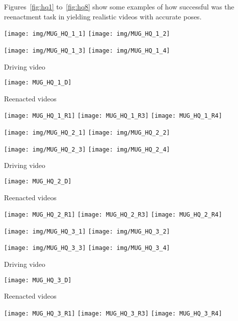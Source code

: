 Figures~\ref{fig:hq1} to~\ref{fig:hq8} show some examples of how successful was the reenactment task in yielding realistic videos with accurate poses.


\begin{figure*}
\texttt{[image: img/MUG\_HQ\_1\_1]}
\texttt{[image: img/MUG\_HQ\_1\_2]}

\vspace{.8mm}
\texttt{[image: img/MUG\_HQ\_1\_3]}
\texttt{[image: img/MUG\_HQ\_1\_4]}

\centering
Driving video

\texttt{[image: MUG\_HQ\_1\_D]}

Reenacted videos

\texttt{[image: MUG\_HQ\_1\_R1]}
\texttt{[image: MUG\_HQ\_1\_R3]}
\texttt{[image: MUG\_HQ\_1\_R4]}
\caption{MUG-HQ: Reenactment examples. Above: selected frames at full resolution. Below: complete sequences.}
\label{fig:hq1}
\end{figure*}

\begin{figure*}
\texttt{[image: img/MUG\_HQ\_2\_1]}
\texttt{[image: img/MUG\_HQ\_2\_2]}

\vspace{.8mm}
\texttt{[image: img/MUG\_HQ\_2\_3]}
\texttt{[image: img/MUG\_HQ\_2\_4]}

\centering
Driving video

\texttt{[image: MUG\_HQ\_2\_D]}

Reenacted videos

\texttt{[image: MUG\_HQ\_2\_R1]}
\texttt{[image: MUG\_HQ\_2\_R3]}
\texttt{[image: MUG\_HQ\_2\_R4]}
\caption{MUG-HQ: Reenactment examples. Above: selected frames at full resolution. Below: complete sequences.}
\label{fig:hq2}
\end{figure*}

\begin{figure*}
\texttt{[image: img/MUG\_HQ\_3\_1]}
\texttt{[image: img/MUG\_HQ\_3\_2]}

\vspace{.8mm}
\texttt{[image: img/MUG\_HQ\_3\_3]}
\texttt{[image: img/MUG\_HQ\_3\_4]}

\centering
Driving video

\texttt{[image: MUG\_HQ\_3\_D]}

Reenacted videos

\texttt{[image: MUG\_HQ\_3\_R1]}
\texttt{[image: MUG\_HQ\_3\_R3]}
\texttt{[image: MUG\_HQ\_3\_R4]}

\caption{MUG-HQ: Reenactment examples. Above: selected frames at full resolution. Below: complete sequences.}
\label{fig:hq3}
\end{figure*}

